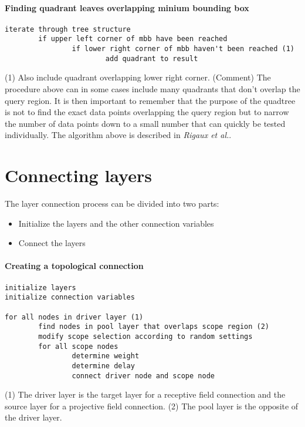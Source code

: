 \documentclass{article}
\begin{document}
\paragraph{Finding quadrant leaves overlapping minium bounding box}

\begin{verbatim}
iterate through tree structure
        if upper left corner of mbb have been reached
                if lower right corner of mbb haven't been reached (1)
                        add quadrant to result
\end{verbatim}

(1) Also include quadrant overlapping lower right corner.
(Comment) The procedure above can in some cases include many quadrants that don't overlap the query region. It is then important to remember that the purpose of the quadtree is not to find the exact data points overlapping the query region but to narrow the number of data points down to a small number that can quickly be tested individually. The algorithm above is described in \emph{Rigaux et al.}\cite{rigaux}.

\section{Connecting layers}

The layer connection process can be divided into two parts:

\begin{itemize}
\item Initialize the layers and the other connection variables
\item Connect the layers
\end{itemize}

\paragraph{Creating a topological connection}
\begin{verbatim}
initialize layers
initialize connection variables

for all nodes in driver layer (1)
        find nodes in pool layer that overlaps scope region (2)
        modify scope selection according to random settings
        for all scope nodes
                determine weight
                determine delay
                connect driver node and scope node
\end{verbatim}

(1) The driver layer is the target layer for a receptive field connection and the source layer for a projective field connection.
(2) The pool layer is the opposite of the driver layer.
\end{document}
